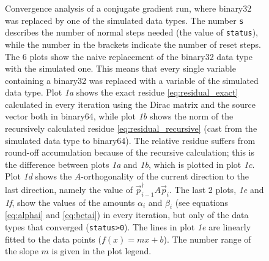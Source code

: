 \documentclass{article}
\theoremstyle{plain} %
\theoremstyle{convention} %
\theoremstyle{remark} %
\def\code#1{\texttt{#1}}
\numberwithin{equation}{section}
\begin{document}
\begin{figure}
    \caption{Convergence analysis of a conjugate gradient run, where \gls{binary32} was replaced by one of the simulated data types. The number \code{s} describes the number of normal steps needed (the value of \code{status}), while the number in the brackets indicate the number of reset steps. The 6 plots show the naive replacement of the \gls{binary32} data type with the simulated one. This means that every single variable containing a \gls{binary32} was replaced with a variable of the simulated data type. Plot \textit{1a} shows the exact residue \eqref{eq:residual_exact} calculated in every iteration using the Dirac matrix and the source vector both in \gls{binary64}, while plot \textit{1b} shows the norm of the recursively calculated residue \eqref{eq:residual_recursive} (cast from the simulated data type to \gls{binary64}). The relative residue suffers from round-off accumulation because of the recursive calculation; this is the difference between plots \textit{1a} and \textit{1b}, which is plotted in plot \textit{1c}. Plot \textit{1d} shows the $A$-orthogonality of the current direction to the last direction, namely the value of $\vec{p}_{i-1}^\dagger A \vec{p}_{i}$. The last 2 plots, \textit{1e} and \textit{1f}, show the values of the amounts $\alpha_i$ and $\beta_i$ (see equations \eqref{eq:alphai} and \eqref{eq:betai}) in every iteration, but only of the data types that converged (\code{status>0}). The lines in plot \textit{1e} are linearly fitted to the data points ($f(x) = m x + b$). The number range of the slope $m$ is given in the plot legend.}
    \label{fig:cgne:naive}
\end{figure}
\end{document}
